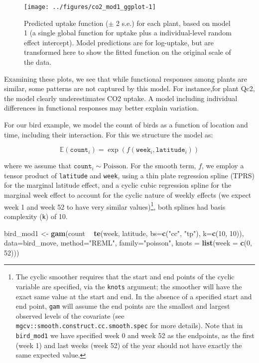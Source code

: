 \documentclass[12pt]{article}
\newenvironment{Shaded}{\begin{snugshade}}{\end{snugshade}}
\newcommand{\KeywordTok}[1]{\textcolor[rgb]{0.13,0.29,0.53}{\textbf{#1}}}
\newcommand{\DataTypeTok}[1]{\textcolor[rgb]{0.13,0.29,0.53}{#1}}
\newcommand{\DecValTok}[1]{\textcolor[rgb]{0.00,0.00,0.81}{#1}}
\newcommand{\StringTok}[1]{\textcolor[rgb]{0.31,0.60,0.02}{#1}}
\newcommand{\OperatorTok}[1]{\textcolor[rgb]{0.81,0.36,0.00}{\textbf{#1}}}
\newcommand{\NormalTok}[1]{#1}
\let\rmarkdownfootnote\footnote%
\def\footnote{\protect\rmarkdownfootnote}
\begin{document}
\begin{figure}
\texttt{[image: ../figures/co2\_mod1\_ggplot-1]} \caption{\label{fig:co2_mod1_predict} Predicted uptake function ($\pm$ 2 s.e.) for each plant, based on model 1 (a single global function for uptake plus a individual-level random effect intercept). Model predictions are for log-uptake, but are transformed here to show the fitted function on the original scale of the data.}\label{fig:co2_mod1_ggplot}
\end{figure}

Examining these plots, we see that while functional responses among
plants are similar, some patterns are not captured by this model. For
instance,for plant Qc2, the model clearly underestimates CO2 uptake. A
model including individual differences in functional responses may
better explain variation.

For our bird example, we model the count of birds as a function of
location and time, including their interaction. For this we structure
the model as:

\[
\mathbb{E}(\texttt{count}_i) = \exp(f(\texttt{week}_i, \texttt{latitude}_i))
\]

where we assume that \(\texttt{count}_i \sim\text{Poisson}\). For the
smooth term, \(f\), we employ a tensor product of \texttt{latitude} and
\texttt{week}, using a thin plate regression spline (TPRS) for the
marginal latitude effect, and a cyclic cubic regression spline for the
marginal week effect to account for the cyclic nature of weekly effects
(we expect week 1 and week 52 to have very similar values)\footnote{The
  cyclic smoother requires that the start and end points of the cyclic
  variable are specified, via the \texttt{knots} argument; the smoother
  will have the exact same value at the start and end. In the absence of
  a specified start and end point, \texttt{gam} will assume the end
  points are the smallest and largest observed levels of the covariate
  (see \texttt{mgcv::smooth.construct.cc.smooth.spec} for more details).
  Note that in \texttt{bird\_mod1} we have specified week 0 and week 52
  as the endpoints, as the first (week 1) and last weeks (week 52) of
  the year should not have exactly the same expected value.}, both
splines had basis complexity (\texttt{k}) of 10.

\begin{Shaded}
\begin{Highlighting}[]
\NormalTok{bird_mod1 <-}\StringTok{ }\KeywordTok{gam}\NormalTok{(count }\OperatorTok{~}\StringTok{ }\KeywordTok{te}\NormalTok{(week, latitude, }\DataTypeTok{bs=}\KeywordTok{c}\NormalTok{(}\StringTok{"cc"}\NormalTok{, }\StringTok{"tp"}\NormalTok{), }\DataTypeTok{k=}\KeywordTok{c}\NormalTok{(}\DecValTok{10}\NormalTok{, }\DecValTok{10}\NormalTok{)),}
                 \DataTypeTok{data=}\NormalTok{bird_move, }\DataTypeTok{method=}\StringTok{"REML"}\NormalTok{, }\DataTypeTok{family=}\StringTok{"poisson"}\NormalTok{,}
                 \DataTypeTok{knots =} \KeywordTok{list}\NormalTok{(}\DataTypeTok{week =} \KeywordTok{c}\NormalTok{(}\DecValTok{0}\NormalTok{, }\DecValTok{52}\NormalTok{)))}
\end{Highlighting}
\end{Shaded}
\end{document}
